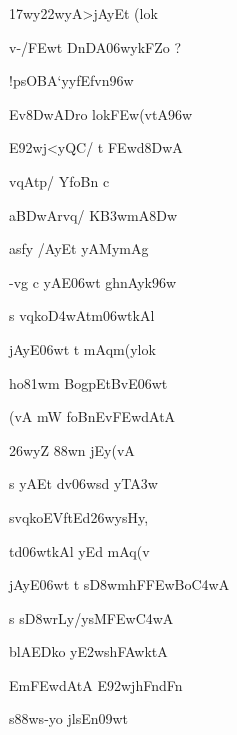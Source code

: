 \ujvers\dnnemsloka 
{\dn {}\317wy\322wyA>jAyEt (lok\?}
\dontdisplaylinenum

\dnnemslokab 
{\dn v-/\3FEwt\? DnDA\306wykFZo{\qvb} {\rs ?\re} \dandadn\dontdisplaylinenum}

\dnnemslokac 
{\dn {}!psOBA`yyfEfvn\396w}
\dontdisplaylinenum

\dnnemslokad 
{\dn Ev\38DwADro lok\3FEw(vtA\396w \vegdn\dontdisplaylinenum}


\ujvers\dnnemsloka 
{\dn E\392wj\?<yQC/\2 t\2 \3FEwd\38DwA}
\dontdisplaylinenum

\dnnemslokab 
{\dn vqA\0tp/\2 YfoBn\2 c \dandadn\dontdisplaylinenum}

\dnnemslokac 
{\dn a\3BDwArvq\0/ K\3B3wmA\38Dw}
\dontdisplaylinenum

\dnnemslokad 
{\dn as\2fy\2 /AyEt yAMymAg\?{\qvb} \vegdn\dontdisplaylinenum}


\ujvers\dnnemsloka 
{\dn -vg{\rdt} c yAE\306wt g\5hnAyk\396w}
\dontdisplaylinenum

\dnnemslokab 
{\dn s vq\0ko\3D4wAtm\306wtkAl\? \dandadn\dontdisplaylinenum}

\dnnemslokac 
{\dn jAyE\306wt t\? mAqm(y\0lok\?}
\dontdisplaylinenum

\dnnemslokad 
{\dn {}ho\381wm\? BogpEtB\0vE\306wt \vegdn\dontdisplaylinenum}


\ujvers\dnnemsloka 
{\dn {}(vA mW\2 foBnEv\3FEwdAtA}
\dontdisplaylinenum

\dnnemslokab 
{\dn {}\326wy\?Z \388w\?n  jEy(vA \dandadn\dontdisplaylinenum}

\dnnemslokac 
{\dn s yAEt d\?v\?\306wsd\2 yT\?\3A3w}
\dontdisplaylinenum

\dnnemslokad 
{\dn svq\0koEVftEd\326wys\2Hy\4, \vegdn\dontdisplaylinenum}


\ujvers\dnnemsloka 
{\dn td\306wtkAl\? yEd mAq(v}
\dontdisplaylinenum

\dnnemslokab 
{\dn jAyE\306wt t\? s\3D8wmhF\3FEwBo\3C4wA \dandadn\dontdisplaylinenum}

\dnnemslokac 
{\dn s s\3D8wrLy/ysM\3FEw\3C4wA}
\dontdisplaylinenum

\dnnemslokad 
{\dn blAEDko y\3E2wsh\3FAwktA\0 \vegdn\dontdisplaylinenum}


\ujvers\dnnemsloka 
{\dn {}Em\3FEwdAtA E\392wjhFndFn}
\dontdisplaylinenum

\dnnemslokab 
{\dn s\2\388ws-yo jls\2En\309wt \dandadn\dontdisplaylinenum}

